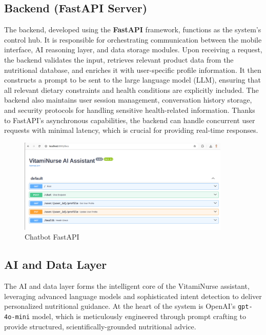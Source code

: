 \subsection{Backend (FastAPI Server)}
The backend, developed using the \textbf{FastAPI} framework, functions as the system’s control hub. It is responsible for orchestrating communication between the mobile interface, AI reasoning layer, and data storage modules. Upon receiving a request, the backend validates the input, retrieves relevant product data from the nutritional database, and enriches it with user-specific profile information. It then constructs a prompt to be sent to the large language model (LLM), ensuring that all relevant dietary constraints and health conditions are explicitly included. The backend also maintains user session management, conversation history storage, and security protocols for handling sensitive health-related information. Thanks to FastAPI’s asynchronous capabilities, the backend can handle concurrent user requests with minimal latency, which is crucial for providing real-time responses.
\begin{center}
\begin{figure}[H]
\includegraphics[width=0.9\textwidth]{images/chatbot_API.png}
\caption{Chatbot FastAPI} 
\label{fig:chatbot API}
\end{figure}
\end{center}

\subsection{AI and Data Layer}
The AI and data layer forms the intelligent core of the VitamiNurse assistant, leveraging advanced language models and sophisticated intent detection to deliver personalized nutritional guidance. At the heart of the system is OpenAI's \texttt{gpt-4o-mini} model, which is meticulously engineered through prompt crafting to provide structured, scientifically-grounded nutritional advice.

